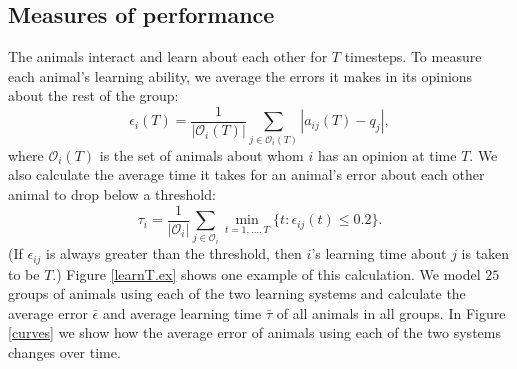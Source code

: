  
\subsection{Measures of performance }
The animals interact and learn about each other for $T$ timesteps. To measure each animal's learning ability, we average the errors it makes in its opinions about the rest of the group: 
\begin{equation*}
\epsilon_i(T) = \frac{1}{|\mathscr{O}_i(T)|}\sum_{j\in \mathscr{O}_i(T)}|a_{ij}(T)-q_j|,
\end{equation*}
where $\mathscr{O}_i(T)$ is the set of animals about whom $i$ has an opinion at time $T$.  
We also calculate the average time it takes for an animal's error about each other animal to drop below a threshold:
\begin{equation*}
\tau_{i} = \frac{1}{|\mathscr{O}_i|} \sum_{j\in\mathscr{O}_i} \min_{t=1,\dots,T}\{t: \epsilon_{ij}(t)\leq 0.2 \}.
\end{equation*}
(If $\epsilon_{ij}$ is always greater than the threshold, then $i$'s learning time about $j$ is taken to be $T$.) Figure \ref{learnT.ex} shows one example of this calculation. We model $25$ groups of animals using each of the two learning systems and calculate the average error $\bar{\epsilon}$ and average learning time $\bar{\tau}$ of all animals in all groups. In Figure \ref{curves} we show how the average error of animals using each of the two systems changes over time.

